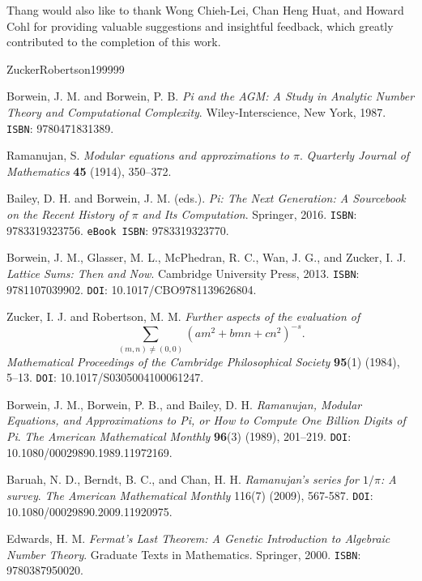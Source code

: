 \documentclass[11pt]{amsart}
\theoremstyle{definition}
\numberwithin{theorem}{section}
\begin{document}
Thang would also like to thank Wong Chieh-Lei, Chan Heng Huat, and Howard Cohl for providing valuable suggestions and insightful feedback, which greatly contributed to the completion of this work. 
\begin{thebibliography}{ZuckerRobertson199999}

Borwein, J. M. and Borwein, P. B. \emph{Pi and the AGM: A Study in Analytic Number Theory and Computational Complexity}. Wiley-Interscience, New York, 1987. \texttt{ISBN}: 9780471831389.

Ramanujan, S. \emph{Modular equations and approximations to $\pi$}. \emph{Quarterly Journal of Mathematics} \textbf{45} (1914), 350--372.

Bailey, D. H. and Borwein, J. M. (eds.). \emph{Pi: The Next Generation: A Sourcebook on the Recent History of $\pi$ and Its Computation}. Springer, 2016. \texttt{ISBN}: 9783319323756. \texttt{eBook ISBN}: 9783319323770.

Borwein, J. M., Glasser, M. L., McPhedran, R. C., Wan, J. G., and Zucker, I. J. \emph{Lattice Sums: Then and Now}. Cambridge University Press, 2013. \texttt{ISBN}: 9781107039902. \texttt{DOI}: 10.1017/CBO9781139626804.

Zucker, I. J. and Robertson, M. M. \emph{Further aspects of the evaluation of \[\sum_{(m,n)\ne(0,0)}(am^2+bmn+cn^2)^{-s}.\]} \emph{Mathematical Proceedings of the Cambridge Philosophical Society} \textbf{95}(1) (1984), 5--13. \texttt{DOI}: 10.1017/S0305004100061247.

Borwein, J. M., Borwein, P. B., and Bailey, D. H. \emph{Ramanujan, Modular Equations, and Approximations to Pi, or How to Compute One Billion Digits of Pi}. \emph{The American Mathematical Monthly} \textbf{96}(3) (1989), 201--219. \texttt{DOI}: 10.1080/00029890.1989.11972169.

Baruah, N. D., Berndt, B. C., and Chan, H. H. \emph{Ramanujan's series for $1/\pi$: A survey}. \emph{The American Mathematical Monthly} 116(7) (2009), 567-587. \texttt{DOI}: 10.1080/00029890.2009.11920975.


Edwards, H. M. \emph{Fermat's Last Theorem: A Genetic Introduction to Algebraic Number Theory}. Graduate Texts in Mathematics. Springer, 2000. \texttt{ISBN}: 9780387950020.


\end{thebibliography}
\end{document}
